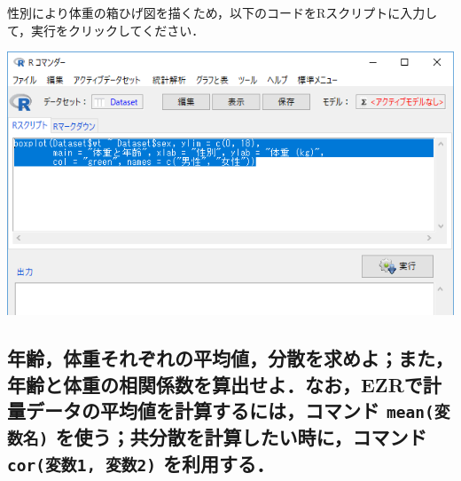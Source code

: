 \documentclass[11pt,]{problemset}
\newenvironment{Shaded}{\begin{snugshade}}{\end{snugshade}}
\newcommand{\DataTypeTok}[1]{\textcolor[rgb]{0.13,0.29,0.53}{#1}}
\newcommand{\DecValTok}[1]{\textcolor[rgb]{0.00,0.00,0.81}{#1}}
\newcommand{\KeywordTok}[1]{\textcolor[rgb]{0.13,0.29,0.53}{\textbf{#1}}}
\newcommand{\NormalTok}[1]{#1}
\newcommand{\OperatorTok}[1]{\textcolor[rgb]{0.81,0.36,0.00}{\textbf{#1}}}
\newcommand{\StringTok}[1]{\textcolor[rgb]{0.31,0.60,0.02}{#1}}
\begin{document}
\newpage
\vfill

性別により体重の箱ひげ図を描くため，以下のコードをRスクリプトに入力して，実行をクリックしてください．

\begin{Shaded}
\end{Shaded}

\begin{center}\includegraphics[width=0.8\linewidth]{pic/box01} \end{center}

\hypertarget{ezr-mean--cor1-2-}{%
\subsection{\texorpdfstring{年齢，体重それぞれの平均値，分散を求めよ；また，年齢と体重の相関係数を算出せよ．なお，EZRで計量データの平均値を計算するには，コマンド
\texttt{mean(変数名)} を使う；共分散を計算したい時に，コマンド
\texttt{cor(変数1,\ 変数2)}
を利用する．}{年齢，体重それぞれの平均値，分散を求めよ；また，年齢と体重の相関係数を算出せよ．なお，EZRで計量データの平均値を計算するには，コマンド mean(変数名) を使う；共分散を計算したい時に，コマンド cor(変数1, 変数2) を利用する．}}\label{ezr-mean--cor1-2-}}
\end{document}
